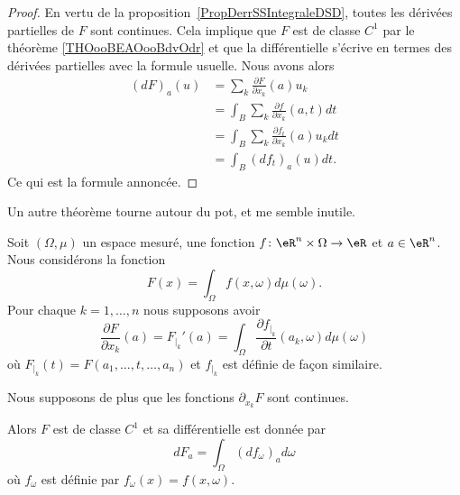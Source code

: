 \begin{proof}
	En vertu de la proposition~\ref{PropDerrSSIntegraleDSD}, toutes les dérivées partielles de \( F\) sont continues. Cela implique que \( F\) est de classe \( C^1\) par le théorème \ref{THOooBEAOooBdvOdr} et que la différentielle s'écrive en termes des dérivées partielles avec la formule usuelle. Nous avons alors
	\begin{subequations}
		\begin{align}
			(dF)_a(u) & =\sum_k\frac{ \partial F }{ \partial x_k }(a)u_k           \\
			          & =\int_B\sum_k\frac{ \partial f }{ \partial x_k }(a,t)dt    \\
			          & =\int_B\sum_k\frac{ \partial f_t }{ \partial x_k }(a)u_kdt \\
			          & =\int_B (df_t)_a(u)dt.
		\end{align}
	\end{subequations}
	Ce qui est la formule annoncée.
\end{proof}

Un autre théorème tourne autour du pot, et me semble inutile.
\begin{theorem} \label{ThoOLAQyRL}
	Soit \( (\Omega,\mu)\) un espace mesuré, une fonction \( f\colon \eR^n\times \Omega\to \eR\) et \( a\in \eR^n\). Nous considérons la fonction
	\begin{equation}
		F(x)=\int_{\Omega}f(x,\omega)d\mu(\omega).
	\end{equation}
	Pour chaque \( k=1,\ldots, n\) nous supposons avoir
	\begin{equation}
		\frac{ \partial F }{ \partial x_k }(a)=F_{|_k}'(a)=\int_{\Omega}\frac{ \partial f_{|_k} }{ \partial t }(a_k,\omega)d\mu(\omega)
	\end{equation}
	où \( F_{|_k}(t)=F(a_1,\ldots, t,\ldots, a_n)\) et \( f_{|_k}\) est définie de façon similaire.

	Nous supposons de plus que les fonctions \( \partial_{x_k}F\) sont continues.

	Alors \( F\) est de classe \( C^1\) et sa différentielle est donnée par
	\begin{equation}
		dF_a=\int_{\Omega}(df_{\omega})_ad\omega
	\end{equation}
	où \( f_{\omega}\) est définie par \( f_{\omega}(x)=f(x,\omega)\).
\end{theorem}

